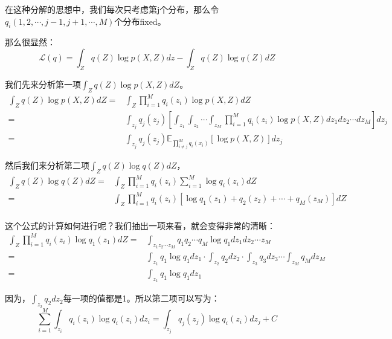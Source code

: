 \documentclass[a4paper]{article}
\begin{document}
在这种分解的思想中，我们每次只考虑第j个分布，那么令$q_i(1,2,\cdots,j-1,j+1,\cdots,M)$个分布fixed。

那么很显然：
\begin{equation}
    \mathcal{L}(q) = \int_Zq(Z)\log p(X,Z)dz - \int_Zq(Z)\log q(Z)dZ
\end{equation}

我们先来分析第一项$ \int_Zq(Z)\log p(X,Z)dZ$。
\begin{equation}
    \begin{split}
        \int_Zq(Z)\log p(X,Z)dZ 
        = & \int_Z\prod_{i=1}^M q_i(z_i)\log p(X,Z)dZ \\
        = & \int_{z_j}q_j(z_j) \left[\int_{z_1}\int_{z_2}\cdots\int_{z_M} \prod_{i=1}^M q_i(z_i)\log p(X,Z)dz_1dz_2\cdots dz_M \right] dz_j \\
        = & \int_{z_j}q_j(z_j) \mathbb{E}_{\prod_{i \neq j}^Mq_i(x_i)}\left[ \log p(X,Z) \right] dz_j
    \end{split}
\end{equation}

然后我们来分析第二项$\int_Zq(Z)\log q(Z)dZ$，
\begin{equation}
    \begin{split}
        \int_Zq(Z)\log q(Z)dZ 
        = & \int_Z \prod_{i=1}^M q_i(z_i) \sum_{i=1}^M \log q_i(z_i)dZ \\
        = & \int_Z \prod_{i=1}^M q_i(z_i) \left[ \log q_1(z_1) + q_2(z_2) + \cdots + q_M(z_M)\right] dZ \\
    \end{split}
\end{equation}

这个公式的计算如何进行呢？我们抽出一项来看，就会变得非常的清晰：
\begin{equation}
    \begin{split}
        \int_Z \prod_{i=1}^M q_i(z_i) \log q_1(z_1) dZ
        = &  \int_{z_1z_2\cdots z_M} q_1q_2\cdots q_M \log q_1 dz_1dz_2 \cdots z_M \\
        = & \int_{z_1}q_1\log q_1 dz_1 \cdot \int_{z_2}q_2dz_2 \cdot \int_{z_3}q_3dz_3 \cdots \int_{z_M}q_Mdz_M \\
        = & \int_{z_1}q_1\log q_1 dz_1
    \end{split}
\end{equation}

因为，$\int_{z_2}q_2dz_2$每一项的值都是1。所以第二项可以写为：
\begin{equation}
    \sum_{i=1}^M \int_{z_i} q_i(z_i)\log q_i(z_i)  dz_i =  \int_{z_j} q_j(z_j)\log q_i(z_i) dz_j + C
\end{equation}
\end{document}
